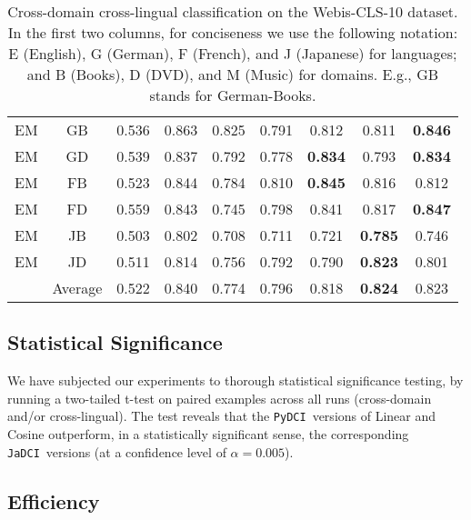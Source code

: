 \documentclass{article}
\newcommand{\jadci}{\texttt{JaDCI}}
\newcommand{\pydci}{\texttt{PyDCI}}
\begin{document}
\begin{table*}[ht!]
\begin{tabular}{|c|c||c|c|c||c|c||c|c|}
    EM         & GB          & 0.536         & 0.863         & 0.825 & 0.791    & 0.812           & 0.811          & \textbf{0.846} \\
    EM         & GD          & 0.539         & 0.837         & 0.792 & 0.778    & \textbf{0.834}  & 0.793          & \textbf{0.834} \\
    EM         & FB          & 0.523         & 0.844         & 0.784 & 0.810    & \textbf{0.845}  & 0.816          & 0.812          \\
    EM         & FD          & 0.559         & 0.843         & 0.745 & 0.798    & 0.841           & 0.817          & \textbf{0.847} \\
    EM         & JB          & 0.503         & 0.802         & 0.708 & 0.711    & 0.721           & \textbf{0.785} & 0.746          \\
    EM         & JD          & 0.511         & 0.814         & 0.756 & 0.792    & 0.790           & \textbf{0.823} & 0.801          \\ \hline \hline
                                & Average     & 0.522         & 0.840         & 0.774 & 0.796    & 0.818           & \textbf{0.824} & 0.823  \\\hline     
  \end{tabular}
\caption{Cross-domain cross-lingual classification on the
  Webis-CLS-10 dataset. In the first two columns, for conciseness we
  use the following notation: E (English), G (German), F (French), and
  J (Japanese) for languages; and B (Books), D (DVD), and M (Music)
  for domains. E.g., GB stands for German-Books.}
  \label{tab:webis2}
\end{table*}





\subsection{Statistical Significance}
\label{sec:stat}

\noindent We have subjected our experiments to thorough statistical
significance testing, by running a two-tailed t-test on paired
examples across all runs (cross-domain and/or cross-lingual). The test
reveals that the \pydci\ versions of Linear and Cosine outperform, in
a statistically significant sense, the corresponding \jadci\ versions
(at a confidence level of $\alpha=0.005$).



\subsection{Efficiency}
\label{sec:efficiency}
\end{document}
